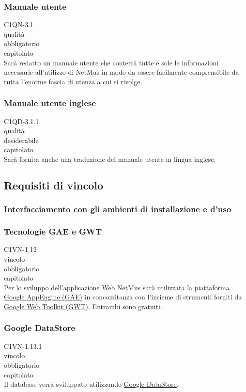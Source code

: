 \subsubsection*{Manuale utente}
 C1QN-3.1 \\
 qualit\`a \\
 obbligatorio \\
 capitolato \\
Sar\`a redatto un manuale utente che conterr\`a tutte e sole le informazioni
necessarie all'utilizzo di NetMus in modo da essere facilmente comprensibile da
tutta l'enorme fascia di utenza a cui si rivolge.

\subsubsection*{Manuale utente inglese}
 C1QD-3.1.1 \\
 qualit\`a \\
 desiderabile \\
 capitolato \\
Sar\`a fornita anche una traduzione del manuale utente in lingua inglese.


\subsection{Requisiti di vincolo}

\subsubsection{Interfacciamento con gli ambienti di installazione e d'uso }

\subsubsection*{Tecnologie GAE e GWT}
 C1VN-1.12 \\
 vincolo \\
 obbligatorio \\
 capitolato \\
Per lo sviluppo dell'applicazione Web NetMus sar\`a utilizzata la piattaforma
\underline{Google AppEngine (GAE)} in concomitanza con l'insieme di strumenti
forniti da \underline{Google Web Toolkit (GWT)}. Entrambi sono gratuiti.

\subsubsection*{Google DataStore}
 C1VN-1.13.1 \\
 vincolo \\
 obbligatorio \\
 capitolato \\
Il database verr\`a sviluppato utilizzando \underline{Google DataStore}.

